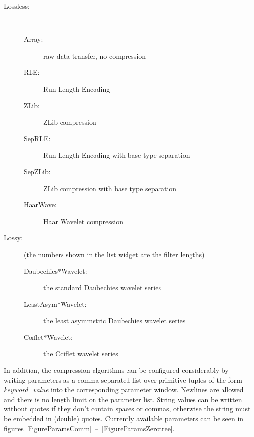 \documentclass[11pt]{article}
\begin{document}
\begin{description}
\item[Lossless:]\ \\
\vspace{-6mm}
\begin{description}
\item[Array:] raw data transfer, no compression
\item[RLE:] Run Length Encoding
\item[ZLib:] ZLib compression
\item[SepRLE:] Run Length Encoding with base type separation
\item[SepZLib:] ZLib compression with base type separation
\item[HaarWave:] Haar Wavelet compression
\end{description}
\item[Lossy:] (the numbers shown in the list widget are the filter lengths)\\
\vspace{-6mm}
\begin{description}
\item[Daubechies*Wavelet:] the standard Daubechies wavelet series
\item[LeastAsym*Wavelet:] the least asymmetric Daubechies wavelet series
\item[Coiflet*Wavelet:] the Coiflet wavelet series
\end{description}
\end{description}

In addition, the compression algorithms can be configured considerably by
writing parameters as a comma-separated list over primitive tuples of the
form \textsl{keyword=value} into the corresponding parameter window. Newlines
are allowed and there is no length limit on the parameter list. String
values can be written without quotes if they don't contain spaces or commas,
otherwise the string must be embedded in (double) quotes. Currently
available parameters can be seen in figures
\mbox{\ref{FigureParamsComm} -- \ref{FigureParamsZerotree}}.

\newcommand{\BeginKeyTable}{%
  \begin{figure}[hptb]\begin{center}\begin{tabular}{|c|c|c|p{90mm}|}%
  \hline%
  \textbf{Keyword} & \textbf{Type} & \textbf{Default} & \textbf{Description}\\%
  \hline%
}
\newcommand{\EndKeyTable}[2]{%
  \hline%
  \end{tabular}%
  \caption{#1} #2%
  \end{center}\end{figure}%
}
\end{document}

